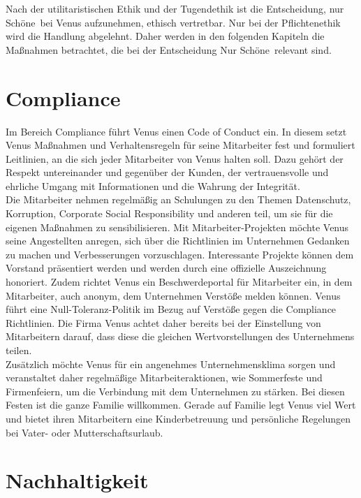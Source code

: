 \documentclass[a4paper, fontsize=12pt, parskip=full, toc=bibliographynumbered]{scrreprt}
\begin{document}
Nach der utilitaristischen Ethik und der Tugendethik ist die Entscheidung, nur \glqq Schöne\grqq~bei Venus aufzunehmen, ethisch vertretbar. Nur bei der Pflichtenethik wird die Handlung abgelehnt. Daher werden in den folgenden Kapiteln die Maßnahmen betrachtet, die bei der Entscheidung \glqq Nur Schöne\grqq~relevant sind.

\author{}
\section{Compliance}

Im Bereich Compliance führt Venus einen Code of Conduct ein. In diesem setzt Venus Maßnahmen und Verhaltensregeln für seine Mitarbeiter fest und formuliert
Leitlinien, an die sich jeder Mitarbeiter von Venus halten soll. Dazu gehört der Respekt untereinander und gegenüber der Kunden, der vertrauensvolle und ehrliche Umgang mit Informationen und die Wahrung der Integrität.\\
Die Mitarbeiter nehmen regelmäßig an Schulungen zu den Themen Datenschutz, Korruption, Corporate Social Responsibility und anderen teil, um sie für die eigenen Maßnahmen zu sensibilisieren. Mit Mitarbeiter-Projekten möchte Venus seine Angestellten anregen, sich über die Richtlinien im Unternehmen Gedanken zu machen und Verbesserungen vorzuschlagen. Interessante Projekte können dem Vorstand präsentiert werden und werden durch eine offizielle Auszeichnung honoriert. Zudem richtet Venus ein Beschwerdeportal für Mitarbeiter ein, in dem Mitarbeiter, auch anonym, dem Unternehmen Verstöße melden können. Venus führt eine Null-Toleranz-Politik im Bezug auf Verstöße gegen die Compliance Richtlinien. Die Firma Venus achtet daher bereits bei der Einstellung von Mitarbeitern darauf, dass diese die gleichen Wertvorstellungen des Unternehmens teilen.\\
Zusätzlich möchte Venus für ein angenehmes Unternehmensklima sorgen und veranstaltet daher regelmäßige Mitarbeiteraktionen, wie Sommerfeste und Firmenfeiern, um die Verbindung mit dem Unternehmen zu stärken. Bei diesen Festen ist die ganze Familie willkommen. Gerade auf Familie legt Venus viel Wert und bietet ihren Mitarbeitern eine Kinderbetreuung und persönliche Regelungen bei Vater- oder Mutterschaftsurlaub.

\author{}
\section{Nachhaltigkeit}
\end{document}
